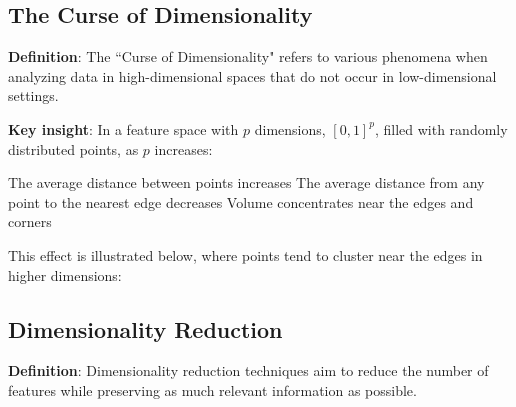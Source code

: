 \subsection{The Curse of Dimensionality}
\textbf{Definition}: The ``Curse of Dimensionality" refers to various phenomena when analyzing data in high-dimensional spaces that do not occur in low-dimensional settings.

\textbf{Key insight}: In a feature space with $p$ dimensions, $[0,1]^p$, filled with randomly distributed points, as $p$ increases:
\begin{outline}
    \1 The average distance between points increases
    \1 The average distance from any point to the nearest edge decreases
    \1 Volume concentrates near the edges and corners
\end{outline}

This effect is illustrated below, where points tend to cluster near the edges in higher dimensions:

\begin{center}
\end{center}

\subsection{Dimensionality Reduction}
\textbf{Definition}: Dimensionality reduction techniques aim to reduce the number of features while preserving as much relevant information as possible.

